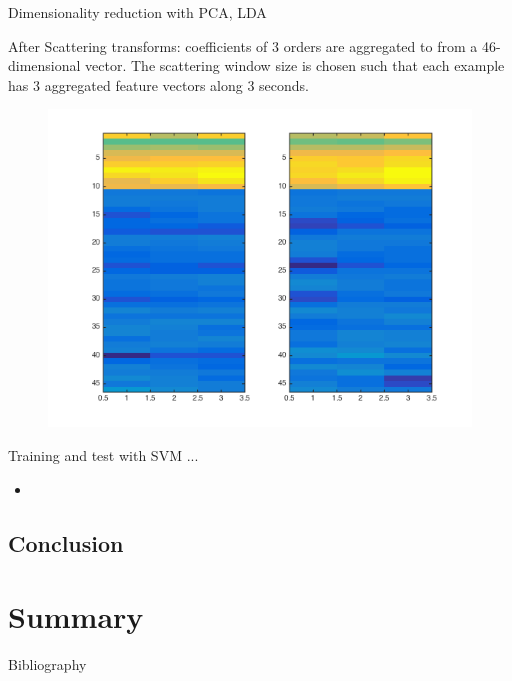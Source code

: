 \documentclass{beamer}
\begin{document}
\begin{frame}{Dimensionality reduction }{ with PCA, LDA}

After Scattering transforms:
coefficients of 3 orders are aggregated to from a 46-dimensional vector. The scattering window size is chosen such that each example has $3$ aggregated feature vectors along 3 seconds.
 
 \begin{figure}[h]
    \centering
   \includegraphics[scale = 0.4]{figures/dataset_coeffs}
    \label{fig:stcoeffs}
\end{figure}
\end{frame}
   
\begin{frame}{ Training and test with SVM ...}
   \begin{itemize}
   \item {  
      }
\end{itemize}
\end{frame}



\subsection{Conclusion}

   



\section*{Summary}



\begin{frame}[allowframebreaks]{Bibliography}


\end{frame}
\end{document}
